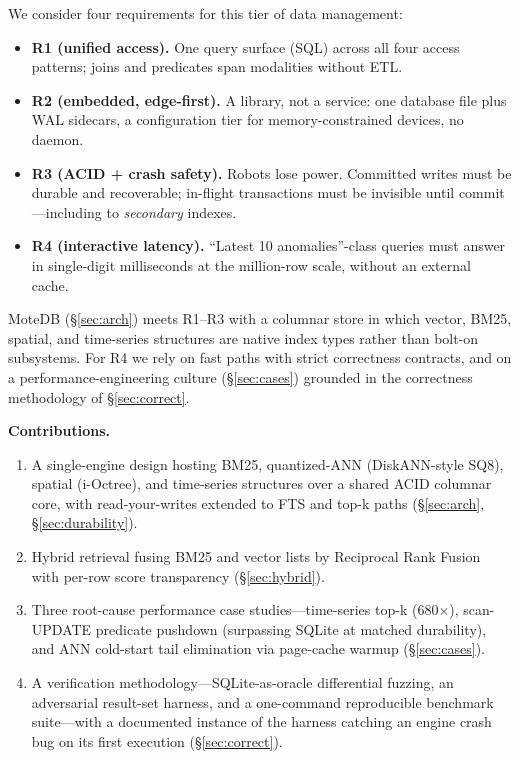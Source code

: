 \documentclass[10pt]{article}
\begin{document}
We consider four requirements for this tier of data management:

\begin{itemize}
\item \textbf{R1 (unified access).} One query surface (SQL) across all four
access patterns; joins and predicates span modalities without ETL.
\item \textbf{R2 (embedded, edge-first).} A library, not a service: one
database file plus WAL sidecars, a configuration tier for
memory-constrained devices, no daemon.
\item \textbf{R3 (ACID + crash safety).} Robots lose power. Committed writes
must be durable and recoverable; in-flight transactions must be invisible
until commit---including to \emph{secondary} indexes.
\item \textbf{R4 (interactive latency).} ``Latest 10 anomalies''-class
queries must answer in single-digit milliseconds at the million-row scale,
without an external cache.
\end{itemize}

MoteDB (\S\ref{sec:arch}) meets R1--R3 with a columnar store in which
vector, BM25, spatial, and time-series structures are native index types
rather than bolt-on subsystems. For R4 we rely on fast paths with strict
correctness contracts, and on a performance-engineering culture
(\S\ref{sec:cases}) grounded in the correctness methodology of
\S\ref{sec:correct}.

\textbf{Contributions.}
\begin{enumerate}
\item A single-engine design hosting BM25, quantized-ANN (DiskANN-style
SQ8), spatial (i-Octree), and time-series structures over a shared ACID
columnar core, with read-your-writes extended to FTS and top-k paths
(\S\ref{sec:arch}, \S\ref{sec:durability}).
\item Hybrid retrieval fusing BM25 and vector lists by Reciprocal Rank
Fusion with per-row score transparency (\S\ref{sec:hybrid}).
\item Three root-cause performance case studies---time-series top-k
(680$\times$), scan-UPDATE predicate pushdown (surpassing SQLite at matched
durability), and ANN cold-start tail elimination via page-cache warmup
(\S\ref{sec:cases}).
\item A verification methodology---SQLite-as-oracle differential fuzzing,
an adversarial result-set harness, and a one-command reproducible benchmark
suite---with a documented instance of the harness catching an engine crash
bug on its first execution (\S\ref{sec:correct}).
\end{enumerate}
\end{document}

